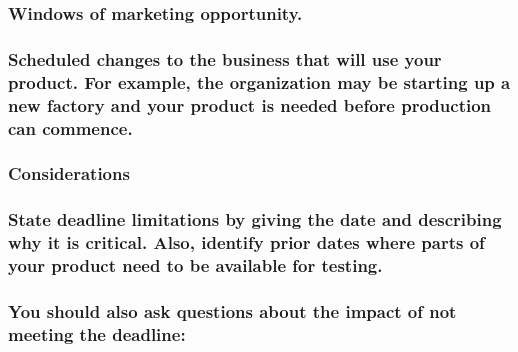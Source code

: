 \documentclass[
]{article}
\begin{document}
\hypertarget{windows-of-marketing-opportunity.}{%
\subsubsection{Windows of marketing
opportunity.}\label{windows-of-marketing-opportunity.}}

\hypertarget{scheduled-changes-to-the-business-that-will-use-your-product.-for-example-the-organization-may-be-starting-up-a-new-factory-and-your-product-is-needed-before-production-can-commence.}{%
\subsubsection{Scheduled changes to the business that will use your
product. For example, the organization may be starting up a new factory
and your product is needed before production can
commence.}\label{scheduled-changes-to-the-business-that-will-use-your-product.-for-example-the-organization-may-be-starting-up-a-new-factory-and-your-product-is-needed-before-production-can-commence.}}

\hypertarget{considerations-7}{%
\subsubsection{Considerations}\label{considerations-7}}

\hypertarget{state-deadline-limitations-by-giving-the-date-and-describing-why-it-is-critical.-also-identify-prior-dates-where-parts-of-your-product-need-to-be-available-for-testing.}{%
\subsubsection{State deadline limitations by giving the date and
describing why it is critical. Also, identify prior dates where parts of
your product need to be available for
testing.}\label{state-deadline-limitations-by-giving-the-date-and-describing-why-it-is-critical.-also-identify-prior-dates-where-parts-of-your-product-need-to-be-available-for-testing.}}

\hypertarget{you-should-also-ask-questions-about-the-impact-of-not-meeting-the-deadline}{%
\subsubsection{You should also ask questions about the impact of not
meeting the
deadline:}\label{you-should-also-ask-questions-about-the-impact-of-not-meeting-the-deadline}}
\end{document}
